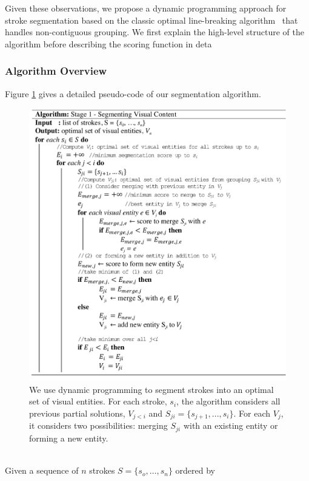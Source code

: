 Given these observations, we propose a dynamic programming approach for
stroke segmentation based on the classic optimal line-breaking
algorithm~\cite{knuth1981breaking} that handles non-contiguous grouping.
We first explain the high-level structure of the algorithm before
describing the scoring function in deta
%
\subsubsection{Algorithm Overview}
Figure \ref{Fig:pseudocode} gives a detailed pseudo-code of our segmentation algorithm.\\    
%
\begin{figure}[h!]
        \centering
        \includegraphics[width=\textwidth]{figures/pseudocode_image.pdf}
	\captionsetup{font=footnotesize}
        \caption{We use dynamic programming to segment strokes into an optimal
set of visual entities. For each stroke, $s_i$, the algorithm considers all previous
partial solutions, $V_{j<i}$ and $S_{ji}=\{s_{j+1}, ..., s_i\}$. For each
$V_j$, it considers two possibilities: merging $S_{ji}$ with an existing
entity or forming a new entity.}
        \label{Fig:pseudocode}
\end{figure}\\
%
Given a sequence of $n$ strokes $S = \{s_o,\dots,s_n\}$ ordered by
